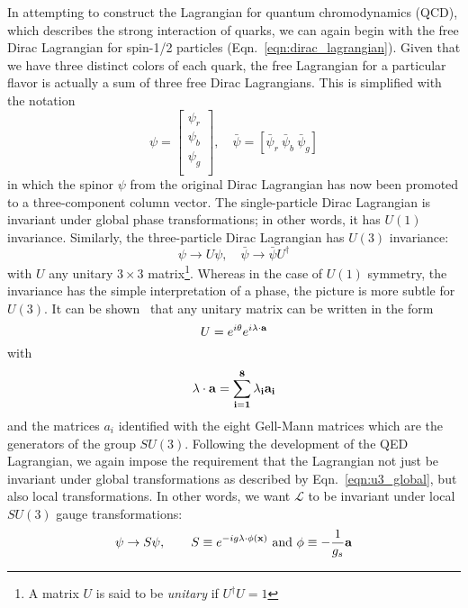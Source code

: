 In attempting to construct the Lagrangian for quantum chromodynamics (QCD), which describes the strong interaction of quarks, we can again begin with the free Dirac Lagrangian for spin-1/2 particles (Eqn.~\ref{eqn:dirac_lagrangian}).
Given that we have three distinct colors of each quark, the free Lagrangian for a particular flavor is actually a sum of three free Dirac Lagrangians.
This is simplified with the notation
\begin{equation}
    \psi = \begin{bmatrix}
        \psi_r \\
        \psi_b \\
        \psi_g \\
    \end{bmatrix},
    \quad\bar{\psi} = [\bar{\psi}_r ~\bar{\psi}_b ~\bar{\psi}_g]
\end{equation}
in which the spinor $\psi$ from the original Dirac Lagrangian has now been promoted to a three-component column vector.
The single-particle Dirac Lagrangian is invariant under global phase transformations; in other words, it has $U(1)$ invariance.
Similarly, the three-particle Dirac Lagrangian has $U(3)$ invariance:
\begin{equation} \label{eqn:u3_global}
    \psi \to U \psi, \quad \bar{\psi} \to \bar{\psi}U^\dagger
\end{equation}
with $U$ any unitary $3 \times 3$ matrix\footnote{A matrix $U$ is said to be \emph{unitary} if $U^\dagger U = 1$}.
Whereas in the case of $U(1)$ symmetry, the invariance has the simple interpretation of a phase, the picture is more subtle for $U(3)$.
It can be shown~\cite{Griffiths:2008zz} that any unitary matrix can be written in the form
\begin{equation}
    U  = e^{i \theta} e^{i \bf{\lambda} \cdot \bf{a}}
\end{equation}
with
\begin{equation}
    \bf{\lambda} \cdot \bf{a} = \sum_{i=1}^8 \lambda_i a_i
\end{equation}
and the matrices $a_i$ identified with the eight Gell-Mann matrices which are the generators of the group $SU(3)$.
Following the development of the QED Lagrangian, we again impose the requirement that the Lagrangian not just be invariant under global transformations as described by Eqn.~\ref{eqn:u3_global}, but also local transformations.
In other words, we want $\mathcal L$ to be invariant under local $SU(3)$ gauge transformations:
\begin{equation}
    \psi \to S \psi, \qquad S \equiv e^{-ig\bf{\lambda} \cdot \phi(x)} \text{ and } \phi \equiv - \frac{1}{g_s} \bf{a}
\end{equation}
